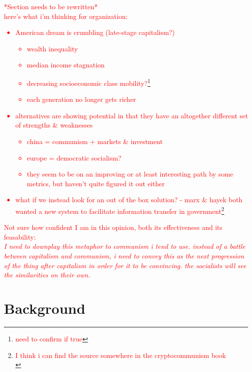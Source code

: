 \documentclass{article}[10pt]
\begin{document}
\textcolor{red}{*Section needs to be rewritten*} \\
\textcolor{red}{here's what i'm thinking for organization:} \\
\textcolor{red}{\begin{itemize}
    \item American dream is crumbling (late-stage capitalism?)
    \begin{itemize}
        \item wealth inequality
        \item median income stagnation
        \item decreasing socioeconomic class mobility?\footnote{
            \textcolor{red}{need to confirm if true}}
        \item each generation no longer gets richer
    \end{itemize}
    \item alternatives are showing potential in that they have an altogether different set of strengths \& weaknesses
    \begin{itemize}
        \item china = communism + markets \& investment
        \item europe = democratic socialism?
        \item they seem to be on an improving or at least interesting path by some metrics, but haven't quite figured it out either
    \end{itemize}
    \item what if we instead look for an out of the box solution? - marx \& hayek both wanted a new system to facilitate information transfer in government\footnote{
        \textcolor{red}{I think i can find the source somewhere in the cryptocommunism book}\\
        \indent \indent {}}
\end{itemize}}

\textcolor{red}{Not sure how confident I am in this opinion, both its effectiveness and its feasability:}\\
\textcolor{red}{\textit{I need to downplay this metaphor to communism i tend to use. 
instead of a battle between capitalism and communism, i need to convey this as the next progression of the thing after capitalism in order for it to be convincing. 
the socialists will see the similarities on their own.}} \\


\section{Background}
\label{section:Background}
\end{document}
